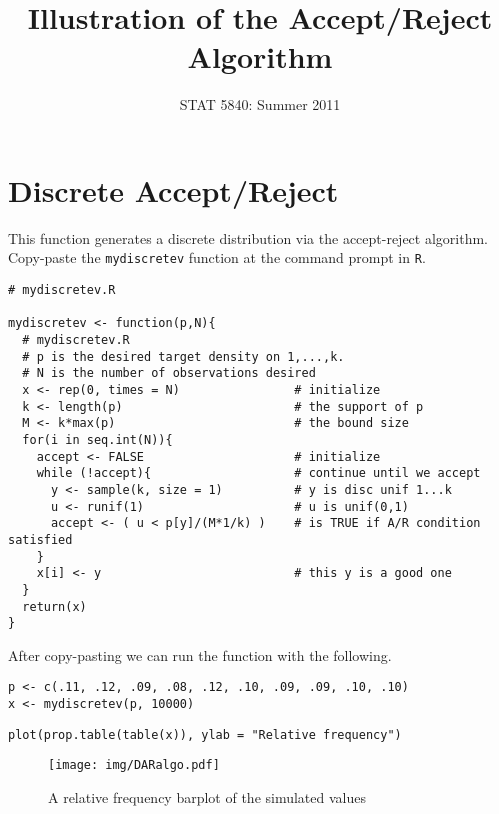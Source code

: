 \documentclass[11pt,english]{article}
\title{Illustration of the Accept/Reject Algorithm}
\date{STAT 5840: Summer 2011}
\begin{document}
\maketitle

\thispagestyle{empty}

\section*{Discrete Accept/Reject}
\label{sec-1}

This function generates a discrete distribution via the accept-reject algorithm.  Copy-paste the \texttt{mydiscretev} function at the command prompt in \texttt{R}.
\begin{verbatim}
# mydiscretev.R

mydiscretev <- function(p,N){
  # mydiscretev.R
  # p is the desired target density on 1,...,k.
  # N is the number of observations desired
  x <- rep(0, times = N)                # initialize
  k <- length(p)                        # the support of p
  M <- k*max(p)                         # the bound size
  for(i in seq.int(N)){
    accept <- FALSE                     # initialize
    while (!accept){                    # continue until we accept
      y <- sample(k, size = 1)          # y is disc unif 1...k
      u <- runif(1)                     # u is unif(0,1)
      accept <- ( u < p[y]/(M*1/k) )    # is TRUE if A/R condition satisfied
    }
    x[i] <- y                           # this y is a good one
  }
  return(x)
}
\end{verbatim}
After copy-pasting we can run the function with the following.
\begin{verbatim}
p <- c(.11, .12, .09, .08, .12, .10, .09, .09, .10, .10)
x <- mydiscretev(p, 10000)
\end{verbatim}


\begin{verbatim}
plot(prop.table(table(x)), ylab = "Relative frequency")
\end{verbatim}

\begin{figure}[h!]
\centering
\texttt{[image: img/DARalgo.pdf]}
\caption{\label{fig:yplot}A relative frequency barplot of the simulated values}
\end{figure}
\end{document}
